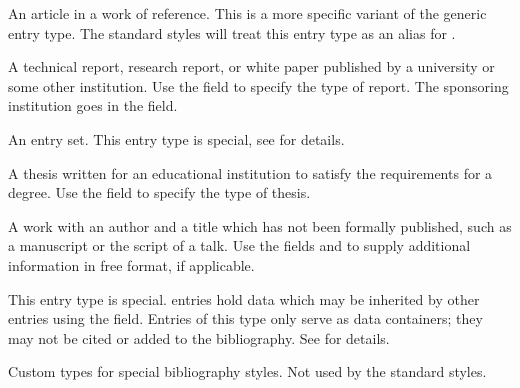 \documentclass{ltxdockit}[2011/03/25]
\begin{document}
\begin{typelist}

An article in a work of reference. This is a more specific variant of the generic  entry type. The standard styles will treat this entry type as an alias for .


A technical report, research report, or white paper published by a university or some other institution. Use the  field to specify the type of report. The sponsoring institution goes in the  field.



An entry set. This entry type is special, see  for details.


A thesis written for an educational institution to satisfy the requirements for a degree. Use the  field to specify the type of thesis.



A work with an author and a title which has not been formally published, such as a manuscript or the script of a talk. Use the fields  and  to supply additional information in free format, if applicable.



\BiberOnlyMark This entry type is special.  entries hold data which may be inherited by other entries using the  field. Entries of this type only serve as data containers; they may not be cited or added to the bibliography. See  for details.


Custom types for special bibliography styles. Not used by the standard styles.

\end{typelist}
\end{document}

